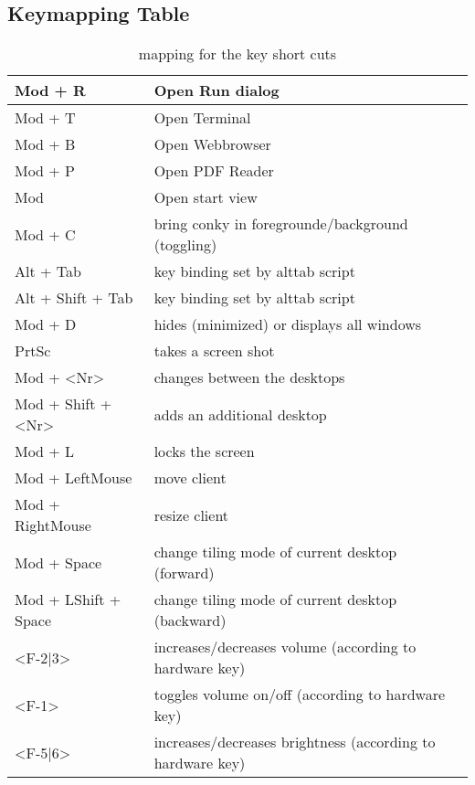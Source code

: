\subsection*{Keymapping Table}
	\begin{table}[H]
		\centering
		\tableformat
		\begin{tabular}{l|p{8cm}}
			\toprule
			Mod + R & Open Run dialog\\\midrule
			Mod + T & Open Terminal\\\midrule
			Mod + B & Open Webbrowser\\\midrule
            Mod + P & Open PDF Reader\\ \midrule
			Mod & Open start view\\ \midrule
			Mod + C & bring conky in foregrounde/background (toggling)\\\midrule
			Alt + Tab & key binding set by alttab script\\\midrule
			Alt + Shift + Tab & key binding set by alttab script\\\midrule
			Mod + D & hides (minimized) or displays all windows\\\midrule
			PrtSc & takes a screen shot\\\midrule
			Mod + <Nr> & changes between the desktops\\\midrule
			Mod + Shift + <Nr> & adds an additional desktop\\\midrule
			Mod + L & locks the screen\\\midrule
			Mod + LeftMouse & move client\\\midrule
			Mod + RightMouse & resize client\\\midrule
			Mod + Space & change tiling mode of current desktop (forward)\\\midrule
			Mod + LShift + Space & change tiling mode of current desktop (backward)\\\midrule
			<F-2|3> & increases/decreases volume (according to hardware key)\\\midrule
			<F-1> & toggles volume on/off (according to hardware key)\\\midrule
			<F-5|6> & increases/decreases brightness (according to hardware key)\\ 
			\bottomrule
		\end{tabular}
		\label{keymapping}
		\caption{mapping for the key short cuts}
	\end{table}				    			